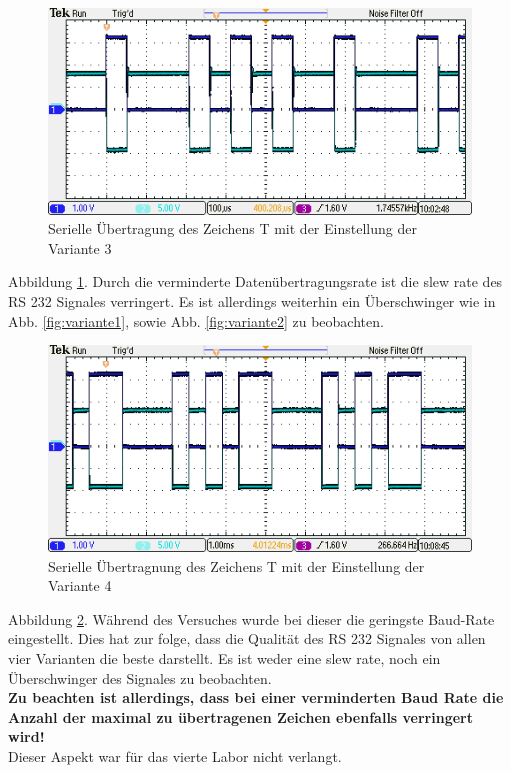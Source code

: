 	\begin{figure}[h]
		\centering
		\includegraphics[width=1\linewidth]{../../Bilder/Variante3}
		\caption{Serielle Übertragung des Zeichens T mit der Einstellung der Variante 3}
		\label{fig:variante3}
	\end{figure}
	
	Abbildung \ref{fig:variante3}. Durch die verminderte Datenübertragungsrate ist die slew rate des RS 232 Signales verringert. Es ist allerdings weiterhin ein Überschwinger wie in Abb. \ref{fig:variante1}, sowie Abb. \ref{fig:variante2} zu beobachten. 
	
	\newpage
	
	\begin{figure}[h]
		\centering
		\includegraphics[width=1\linewidth]{../../Bilder/Variante4}
		\caption{Serielle Übertragnung des Zeichens T mit der Einstellung der Variante 4}
		\label{fig:variante4}
	\end{figure}

Abbildung \ref{fig:variante4}. Während des Versuches wurde bei dieser die geringste Baud-Rate eingestellt. Dies hat zur folge, dass die Qualität des RS 232 Signales von allen vier Varianten die beste darstellt. Es ist weder eine slew rate, noch ein Überschwinger des Signales zu beobachten.\\
\textbf{Zu beachten ist allerdings, dass bei einer verminderten Baud Rate die Anzahl der maximal zu übertragenen Zeichen ebenfalls verringert wird!}\\
Dieser Aspekt war für das vierte Labor nicht verlangt. 	
	\newpage
